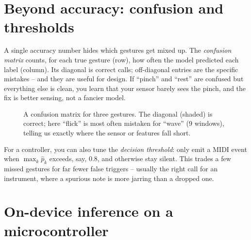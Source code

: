 \section{Beyond accuracy: confusion and thresholds}
\label{ch39:confusion}

A single accuracy number hides which gestures get mixed up. The \emph{confusion matrix}
counts, for each true gesture (row), how often the model predicted each label (column).
Its diagonal is correct calls; off-diagonal entries are the specific mistakes -- and they
are useful for design. If ``pinch'' and ``rest'' are confused but everything else is clean,
you learn that your sensor barely sees the pinch, and the fix is better sensing, not a
fancier model.

\begin{figure}[H]
\centering
{}
\caption{A confusion matrix for three gestures. The diagonal (shaded) is correct; here
``flick'' is most often mistaken for ``wave'' (9 windows), telling us exactly where the
sensor or features fall short.}
\label{ch39:fig-confusion}
\end{figure}

For a controller, you can also tune the \emph{decision threshold}: only emit a MIDI event
when $\max_k \hat{p}_k$ exceeds, say, $0.8$, and otherwise stay silent. This trades a few
missed gestures for far fewer false triggers -- usually the right call for an instrument,
where a spurious note is more jarring than a dropped one.

\section{On-device inference on a microcontroller}
\label{ch39:ondevice}

